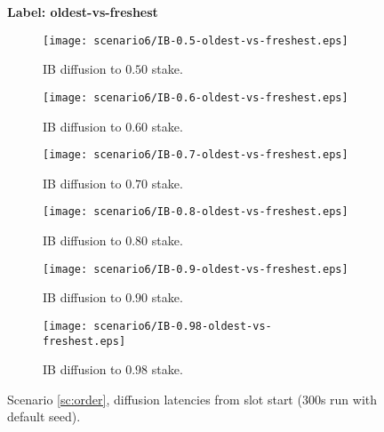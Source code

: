 \documentclass[11pt,a4paper]{article}
\newcommand{\debug}[1]{#1}
\begin{document}
\begin{figure}[htbp]
    \centering
    \debug{\textbf{Label: oldest-vs-freshest} \\}
    \begin{subfigure}[b]{0.45\textwidth}
        \centering
        \texttt{[image: scenario6/IB-0.5-oldest-vs-freshest.eps]}
        \caption{IB diffusion to $0.50$ stake.}
        \label{fig:oldest-vs-freshest:ib0.5}
    \end{subfigure}
    \hfill
    \begin{subfigure}[b]{0.45\textwidth}
        \centering
        \texttt{[image: scenario6/IB-0.6-oldest-vs-freshest.eps]}
        \caption{IB diffusion to $0.60$ stake.}
        \label{fig:oldest-vs-freshest:ib0.6}
    \end{subfigure}
    
    \vspace{1em}
    
    \begin{subfigure}[b]{0.45\textwidth}
        \centering
        \texttt{[image: scenario6/IB-0.7-oldest-vs-freshest.eps]}
        \caption{IB diffusion to $0.70$ stake.}
        \label{fig:oldest-vs-freshest:ib0.7}
    \end{subfigure}
    \hfill
    \begin{subfigure}[b]{0.45\textwidth}
        \centering
        \texttt{[image: scenario6/IB-0.8-oldest-vs-freshest.eps]}
        \caption{IB diffusion to $0.80$ stake.}
        \label{fig:oldest-vs-freshest:ib0.8}
    \end{subfigure}
    
    \vspace{1em}
    
    \begin{subfigure}[b]{0.45\textwidth}
        \centering
        \texttt{[image: scenario6/IB-0.9-oldest-vs-freshest.eps]}
        \caption{IB diffusion to $0.90$ stake.}
        \label{fig:oldest-vs-freshest:ib0.9}
    \end{subfigure}
    \hfill
    \begin{subfigure}[b]{0.45\textwidth}
        \centering
        \texttt{[image: scenario6/IB-0.98-oldest-vs-freshest.eps]}
        \caption{IB diffusion to $0.98$ stake.}
        \label{fig:oldest-vs-freshest:ib0.98}
    \end{subfigure}

    \caption{Scenario \ref{sc:order}, diffusion latencies from slot start (300s run with default seed).}
    \label{fig:oldest-vs-freshest}
\end{figure}



\end{document}
